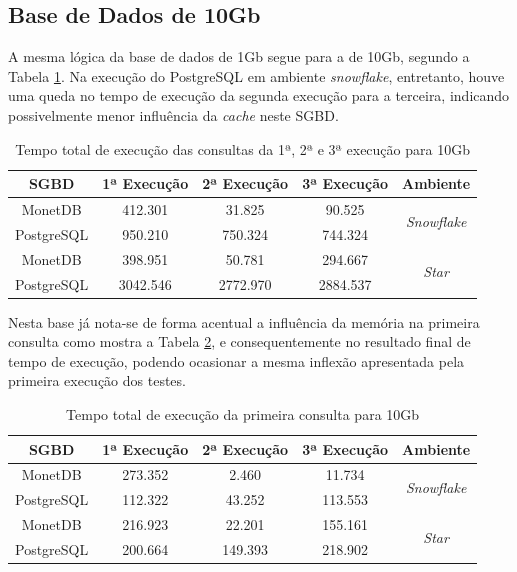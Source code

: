 \subsection{Base de Dados de 10Gb}

A mesma lógica da base de dados de 1Gb segue para a de 10Gb, segundo a Tabela \ref{tab:queries_cache_10}. Na execução do PostgreSQL em ambiente \textit{snowflake}, entretanto, houve uma queda no tempo de execução da segunda execução para a terceira, indicando possivelmente menor influência da \textit{cache} neste SGBD.


\begin{table}[htpb]
        \centering
        \caption{Tempo total de execução das consultas da 1ª, 2ª e 3ª execução para 10Gb}
        \label{tab:queries_cache_10}
        \begin{tabular}{|c|c|c|c|c|}
        \hline
        SGBD       & 1ª Execução & 2ª Execução & 3ª Execução & Ambiente                            \\ \hline
        MonetDB    & 412.301     & 31.825      & 90.525      & \multirow{2}{*}{\textit{Snowflake}} \\ \cline{1-4}
        PostgreSQL & 950.210     & 750.324     & 744.324     &                                     \\ \hline
        MonetDB    & 398.951     & 50.781      & 294.667     & \multirow{2}{*}{\textit{Star}}      \\ \cline{1-4}
        PostgreSQL & 3042.546    & 2772.970    & 2884.537    &                                     \\ \hline
        \end{tabular}
\end{table}

Nesta base já nota-se de forma acentual a influência da memória na primeira consulta como mostra a Tabela \ref{tab:q1_cache_10}, e consequentemente no resultado final de tempo de execução, podendo ocasionar a mesma inflexão apresentada pela primeira execução dos testes.

\begin{table}[htpb]
        \centering
        \caption{Tempo total de execução da primeira consulta para 10Gb}
        \label{tab:q1_cache_10}
        \begin{tabular}{|c|c|c|c|c|}
        \hline
        SGBD       & 1ª Execução & 2ª Execução & 3ª Execução & Ambiente                            \\ \hline
        MonetDB    & 273.352     & 2.460       & 11.734      & \multirow{2}{*}{\textit{Snowflake}} \\ \cline{1-4}
        PostgreSQL & 112.322     & 43.252      & 113.553     &                                     \\ \hline
        MonetDB    & 216.923     & 22.201      & 155.161     & \multirow{2}{*}{\textit{Star}}      \\ \cline{1-4}
        PostgreSQL & 200.664     & 149.393     & 218.902     &                                     \\ \hline
        \end{tabular}
\end{table}

